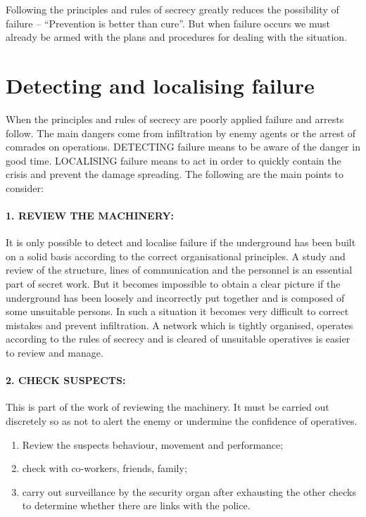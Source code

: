 Following the principles and rules of secrecy greatly reduces the
possibility of failure -- ``Prevention is better than cure''. But when
failure occurs we must already be armed with the plans and procedures
for dealing with the situation.

\section{Detecting and localising failure}

When the principles and rules of secrecy are poorly applied failure and
arrests follow. The main dangers come from infiltration by enemy agents
or the arrest of comrades on operations. DETECTING failure means to be
aware of the danger in good time. LOCALISING failure means to act in
order to quickly contain the crisis and prevent the damage spreading.
The following are the main points to consider:

\paragraph{1. REVIEW THE MACHINERY:}

It is only possible to detect and localise failure if the underground
has been built on a solid basis according to the correct organisational
principles. A study and review of the structure, lines of communication
and the personnel is an essential part of secret work. But it becomes
impossible to obtain a clear picture if the underground has been loosely
and incorrectly put together and is composed of some unsuitable persons.
In such a situation it becomes very difficult to correct mistakes and
prevent infiltration. A network which is tightly organised, operates
according to the rules of secrecy and is cleared of unsuitable
operatives is easier to review and manage.

\paragraph{2. CHECK SUSPECTS:}

This is part of the work of reviewing the machinery. It must be carried
out discretely so as not to alert the enemy or undermine the confidence
of operatives.

\begin{enumerate}
\tightlist
\item
  Review the suspects behaviour, movement and performance;
\item
  check with co-workers, friends, family;
\item
  carry out surveillance by the security organ after exhausting the
  other checks to determine whether there are links with the police.
\end{enumerate}

